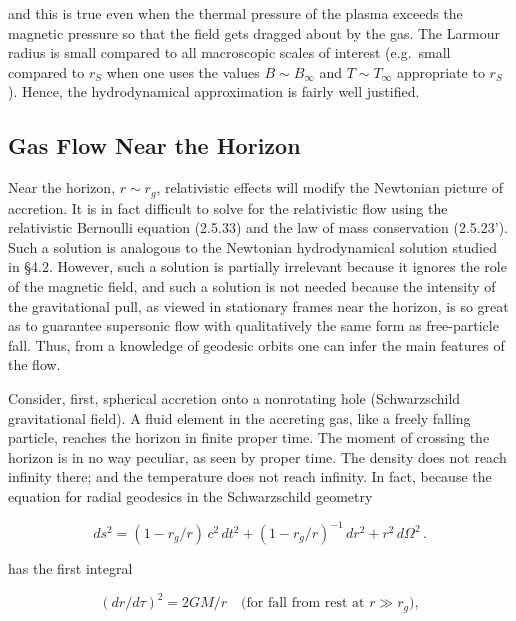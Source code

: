 \documentclass[aps,prd,twocolumn,superscriptaddress,nofootinbib]{revtex4-2}
\begin{document}
and this is true even when the thermal pressure of the plasma exceeds the
magnetic pressure so that the field gets dragged about by the gas.  The Larmour
radius is small compared to all macroscopic scales of interest (e.g.\ small compared
to $r_S$ when one uses the values $B \sim B_\infty$ and $T \sim T_\infty$ appropriate to $r_S$).  Hence,
the hydrodynamical approximation is fairly well justified.


\subsection{Gas Flow Near the Horizon}
\label{sec:4.7}

Near the horizon, $r \sim r_g$, relativistic effects will modify the Newtonian picture
of accretion.  It is in fact difficult to solve for the relativistic flow using the
relativistic Bernoulli equation (2.5.33) and the law of mass conservation (2.5.23').
Such a solution is analogous to the Newtonian hydrodynamical solution studied
in \S4.2.  However, such a solution is partially irrelevant because it ignores the
role of the magnetic field, and such a solution is not needed because the intensity
of the gravitational pull, as viewed in stationary frames near the horizon, is so
great as to guarantee supersonic flow with qualitatively the same form as free-particle
fall.  Thus, from a knowledge of geodesic orbits one can infer the main
features of the flow.

Consider, first, spherical accretion onto a nonrotating hole (Schwarzschild
gravitational field).  A fluid element in the accreting gas, like a freely falling
particle, reaches the horizon in finite proper time.  The moment of crossing the
horizon is in no way peculiar, as seen by proper time.  The density does not
reach infinity there; and the temperature does not reach infinity.  In fact,
because the equation for radial geodesics in the Schwarzschild geometry

\begin{equation}
ds^2 = (1 - r_g/r)\,c^2\,dt^2 + (1 - r_g/r)^{-1}\,dr^2 + r^2\,d\Omega^2\,.
\tag{4.7.1}
\end{equation}

has the first integral

\begin{equation}
(dr/d\tau)^2 = 2GM/r \quad\text{(for fall from rest at } r \gg r_g\text{)},
\tag{4.7.2}
\end{equation}
\end{document}
